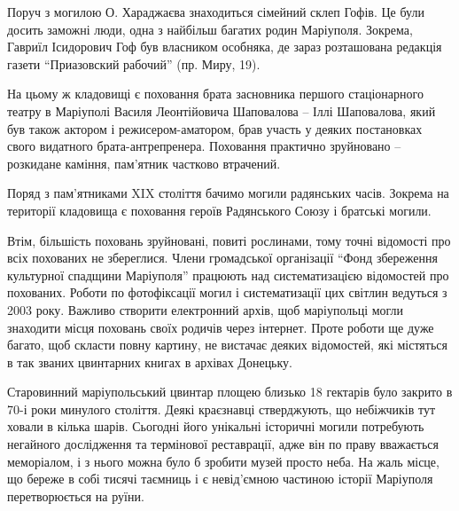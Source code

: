 
Поруч з могилою О. Хараджаєва знаходиться сімейний склеп Гофів. Це були досить
заможні люди, одна з найбільш багатих родин Маріуполя. Зокрема, Гавриїл
Ісидорович Гоф був власником особняка, де зараз розташована редакція газети
\enquote{Приазовский рабочий} (пр. Миру, 19).

На цьому ж кладовищі є поховання брата засновника першого стаціонарного театру
в Маріуполі Василя Леонтійовича Шаповалова  – Іллі Шаповалова, який був також
актором і режисером-аматором, брав участь у деяких постановках свого видатного
брата-антрепренера. Поховання практично зруйновано – розкидане каміння,
пам'ятник частково втрачений.

Поряд з пам'ятниками XIX століття бачимо могили радянських часів. Зокрема на
території кладовища є поховання героїв Радянського Союзу і братські могили.


Втім, більшість поховань зруйновані, повиті рослинами, тому точні відомості про
всіх похованих не збереглися. Члени громадської організації \enquote{Фонд збереження
культурної спадщини Маріуполя} працюють над систематизацією відомостей про
похованих. Роботи по фотофіксації могил і систематизації цих світлин ведуться з
2003 року. Важливо створити електронний архів, щоб маріупольці могли знаходити
місця поховань своїх родичів через інтернет. Проте роботи ще дуже багато, щоб
скласти повну картину, не вистачає деяких відомостей, які містяться в так
званих цвинтарних книгах в архівах Донецьку.


Старовинний маріупольський цвинтар площею близько 18 гектарів було закрито в
70-і роки минулого століття. Деякі краєзнавці стверджують, що небіжчиків тут
ховали в кілька шарів. Сьогодні його унікальні історичні могили потребують
негайного дослідження та термінової реставрації, адже він по праву вважається
меморіалом, і з нього можна було б зробити музей просто неба. На жаль місце, що
береже в собі тисячі таємниць і є невід'ємною частиною історії Маріуполя
перетворюється на руїни.

